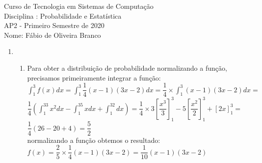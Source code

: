 \documentclass[a4paper, 12pt]{article}
\begin{document}
\begin{center}
Curso de Tecnologia em Sistemas de Computação \\
Disciplina : Probabilidade e Estatística \\
AP2 - Primeiro Semestre de 2020 \\
Nome: Fábio de Oliveira Branco\\ 
\end{center}


\begin{enumerate}
\item \begin{enumerate}
\item Para obter a distribuição de probabilidade normalizando a função, precisamos primeiramente integrar a função:\\
$\int_{1}^{3} f(x)dx = \int _1^3\dfrac{1}{4}\left(x-1\right)\left(3x-2\right)dx= \dfrac{1}{4}\times \int _1^3\left(x-1\right)\left(3x-2\right)dx=$\\
$\dfrac{1}{4}\left(\int _1^33x^2dx-\int _1^35xdx+\int _1^32dx\right)= \dfrac{1}{4} \times 3\left[\dfrac{x^3}{3}\right]^3_1 - 5\left[\dfrac{x^2}{2}\right]^3_1 + \left[2x\right]^3_1 =$\\
$\dfrac{1}{4}\left(26-20+4\right) = \dfrac{5}{2}$ \\ 

normalizando a função obtemos o resultado: \\
$f(x)= \dfrac{2}{5} \times \dfrac{1}{4}(x-1)(3x-2) = \dfrac{1}{10}(x-1)(3x-2)$
\end{enumerate}
	
	 
\end{enumerate}

 
\end{document}
